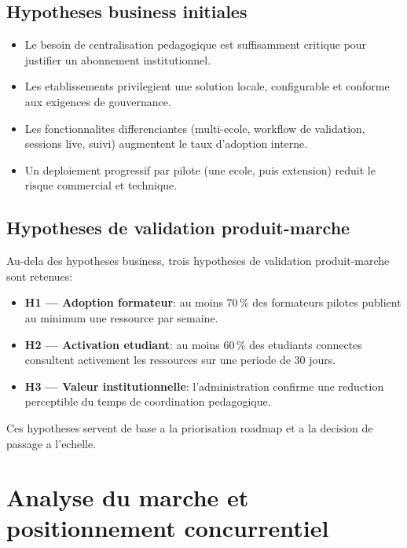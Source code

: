 ﻿\documentclass[12pt,a4paper,oneside]{report}
\begin{document}
\subsection{Hypotheses business initiales}

\begin{itemize}
  \item Le besoin de centralisation pedagogique est suffisamment critique pour justifier un abonnement institutionnel.
  \item Les etablissements privilegient une solution locale, configurable et conforme aux exigences de gouvernance.
  \item Les fonctionnalites differenciantes (multi-ecole, workflow de validation, sessions live, suivi) augmentent le taux d'adoption interne.
  \item Un deploiement progressif par pilote (une ecole, puis extension) reduit le risque commercial et technique.
\end{itemize}

\subsection{Hypotheses de validation produit-marche}

Au-dela des hypotheses business, trois hypotheses de validation produit-marche sont retenues:
\begin{itemize}
  \item \textbf{H1 --- Adoption formateur}: au moins 70\,\% des formateurs pilotes publient au minimum une ressource par semaine.
  \item \textbf{H2 --- Activation etudiant}: au moins 60\,\% des etudiants connectes consultent activement les ressources sur une periode de 30 jours.
  \item \textbf{H3 --- Valeur institutionnelle}: l'administration confirme une reduction perceptible du temps de coordination pedagogique.
\end{itemize}

Ces hypotheses servent de base a la priorisation roadmap et a la decision de passage a l'echelle.

\section{Analyse du marche et positionnement concurrentiel}
\end{document}
